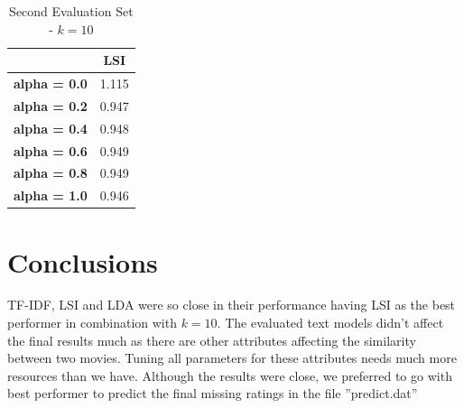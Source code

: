 \documentclass{sigish}
\begin{document}
\begin{table}[]
\centering
\begin{tabular}{|c|c|}
\hline
                     & \textbf{LSI} \\ \hline
\textbf{alpha = 0.0} & 1.115        \\ \hline
\textbf{alpha = 0.2} & 0.947        \\ \hline
\textbf{alpha = 0.4} & 0.948        \\ \hline
\textbf{alpha = 0.6} & 0.949        \\ \hline
\textbf{alpha = 0.8} & 0.949        \\ \hline
\textbf{alpha = 1.0} & 0.946        \\ \hline

\end{tabular}
\caption{Second Evaluation Set - $ k = 10 $}
\label{tab:eval_02}
\end{table}

\section{Conclusions}

TF-IDF, LSI and LDA were so close in their performance having LSI as the best performer in combination with $ k = 10 $. The evaluated text models didn't affect the final results much as there are other attributes affecting the similarity between two movies. Tuning all parameters for these attributes needs much more resources than we have. Although the results were close, we preferred to go with best performer to predict the final missing ratings in the file ''predict.dat''



\end{document}
